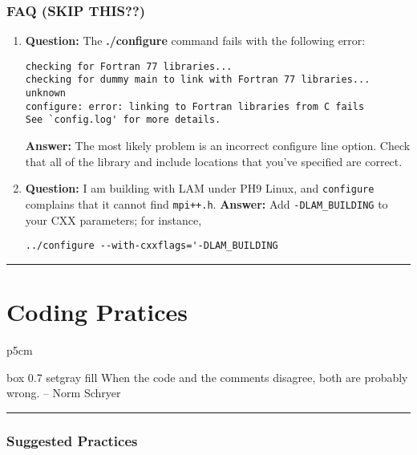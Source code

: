 \documentclass[10pt,letter,relax]{SANDreport}
\newcommand{\HRule}{\noindent\rule{\linewidth}{1mm}}
\begin{document}

\section{FAQ (SKIP THIS??)}
\label{sec:faq}

\begin{enumerate}
\item {\bf Question:} The {\bf ./configure} command
fails with the following error:
\begin{verbatim}
checking for Fortran 77 libraries...
checking for dummy main to link with Fortran 77 libraries... unknown
configure: error: linking to Fortran libraries from C fails
See `config.log' for more details.
\end{verbatim}
{\bf Answer:} The most likely problem is an incorrect configure line option.   Check
that all of the library and include locations that you've specified are
correct.
%
\item {\bf Question:} I am building with LAM under PH9 Linux, and
  {\tt configure} complains that it cannot find {\tt mpi++.h}.
{\bf Answer:} Add \verb!-DLAM_BUILDING! to your CXX parameters; for
instance,
\begin{verbatim}
../configure --with-cxxflags='-DLAM_BUILDING
\end{verbatim}
\end{enumerate}


\clearpage
\newpage

\vspace*{3cm}
\HRule
\part{Coding Pratices}

\medskip

\hfill
\begin{tabular}{p{5cm}}
\begin{boxitpara}{box 0.7 setgray fill}
When the code and the comments disagree, both are probably wrong. -- Norm Schryer
\end{boxitpara}
\end{tabular}

\HRule
\clearpage
\newpage


\section{Suggested Practices}
\label{sec:code}
\end{document}

